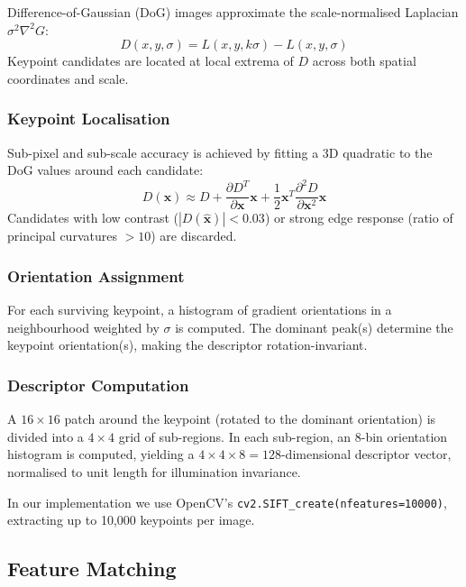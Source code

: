 \documentclass[conference]{IEEEtran}
\begin{document}
Difference-of-Gaussian (DoG) images approximate the scale-normalised
Laplacian $\sigma^2 \nabla^2 G$:
\begin{equation}
  D(x, y, \sigma) = L(x, y, k\sigma) - L(x, y, \sigma)
\end{equation}
Keypoint candidates are located at local extrema of $D$ across both spatial
coordinates and scale.

\subsubsection{Keypoint Localisation}
Sub-pixel and sub-scale accuracy is achieved by fitting a 3D quadratic to the
DoG values around each candidate:
\begin{equation}
  D(\mathbf{x}) \approx D + \frac{\partial D^T}{\partial \mathbf{x}} \mathbf{x}
  + \frac{1}{2} \mathbf{x}^T \frac{\partial^2 D}{\partial \mathbf{x}^2} \mathbf{x}
\end{equation}
Candidates with low contrast ($|D(\hat{\mathbf{x}})| < 0.03$) or strong edge
response (ratio of principal curvatures $> 10$) are discarded.

\subsubsection{Orientation Assignment}
For each surviving keypoint, a histogram of gradient orientations in a
neighbourhood weighted by $\sigma$ is computed. The dominant peak(s) determine
the keypoint orientation(s), making the descriptor rotation-invariant.

\subsubsection{Descriptor Computation}
A $16 \times 16$ patch around the keypoint (rotated to the dominant
orientation) is divided into a $4 \times 4$ grid of sub-regions. In each
sub-region, an 8-bin orientation histogram is computed, yielding a
$4 \times 4 \times 8 = 128$-dimensional descriptor vector, normalised to
unit length for illumination invariance.

In our implementation we use OpenCV's \texttt{cv2.SIFT\_create(nfeatures=10000)},
extracting up to 10,000 keypoints per image.

\subsection{Feature Matching}
\end{document}
